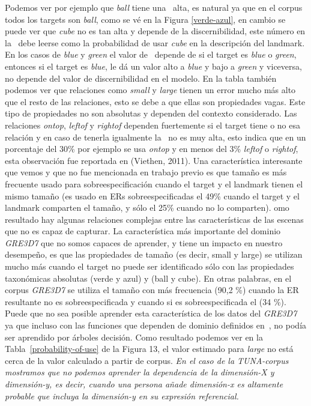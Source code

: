 Podemos ver por ejemplo que {\it ball} tiene una \puse\ alta, es natural ya que en el corpus todos los targets son {\it ball}, como se v\'e en la Figura \ref{verde-azul}, en cambio se puede ver que {\it cube} no es tan alta y depende de la discernibilidad, este n\'umero en la \puse\ debe leerse como la probabilidad de usar {\it cube} en la descripci\'on del landmark. En los casos de {\it blue} y {\it green} el valor de \puse\ depende de si el target es {\it blue} o {\it green}, entonces si el target es {\it blue}, le d\'a un valor alto a {\it blue} y bajo a {\it green} y viceversa, no depende del valor de discernibilidad en el modelo. En la tabla tambi\'en podemos ver que relaciones como {\it small} y {\it large} tienen un error mucho m\'as alto que el resto de las relaciones, esto se debe a que ellas son propiedades vagas. Este tipo de propiedades no son absolutas y dependen del contexto considerado.
Las relaciones {\it ontop}, {\it leftof} y {\it rightof} dependen fuertemente si el target tiene o no esa relaci\'on y en caso de tenerla igualmente la \puse\ no es muy alta, esto indica que en un porcentaje del 30\% por ejemplo se usa {\it ontop} y en menos del 3\% {\it leftof} o {\it rightof}, esta observaci\'on fue reportada en (Viethen, 2011). Una caracter\'istica interesante que vemos y que no fue mencionada en trabajo previo es que tama\~no es m\'as frecuente usado para sobreespecificaci\'on cuando el target y el landmark tienen el mismo tama\~no 
(es usado en ERs sobreespecificadas el 49\% cuando el target y el landmark comparten el tama\~no, y s\'olo el 25\% cuando no lo comparten).
omo resultado hay algunas relaciones complejas
entre las caracter\'{i}sticas de las escenas que no es capaz de
capturar. La caracter\'{i}stica m\'as importante del dominio \textit{GRE3D7}
que no somos capaces de aprender, y tiene un impacto en nuestro desempe\~no, es que
las propiedades de tama\~no (es decir, small y large) se utilizan mucho
m\'as cuando el target no puede ser identificado s\'olo con las propiedades taxon\'omicas absolutas 
(verde y azul) y (ball y cube). En otras palabras, en el corpus \textit{GRE3D7} se utiliza el tama\~no con m\'as frecuencia (90,2 \%)
cuando la ER resultante no es sobreespecificada y cuando si es sobreespecificada el (34 \%). 
Puede que no sea posible aprender esta caracter\'{i}stica de los
datos del \textit{GRE3D7} ya que incluso con las funciones que dependen de dominio definidos
en~\cite[Cap\'{i}tulo 6] {viet:gene11}, no pod\'{i}a ser aprendido por \'arboles decisi\'on. 
Como resultado podemos ver en la Tabla~\ref{probability-of-use} de la Figura 13, el valor estimado para 
\emph{large} no est\'a cerca de la
valor calculado a partir de corpus. \textit{En el caso de la TUNA-corpus
  mostramos que no podemos aprender la dependencia de la dimensi\'on-X y
  dimensi\'on-y, es decir, cuando una persona a\~nade dimensi\'on-x es altamente
  probable que incluya la dimensi\'on-y en su expresi\'on referencial.}
